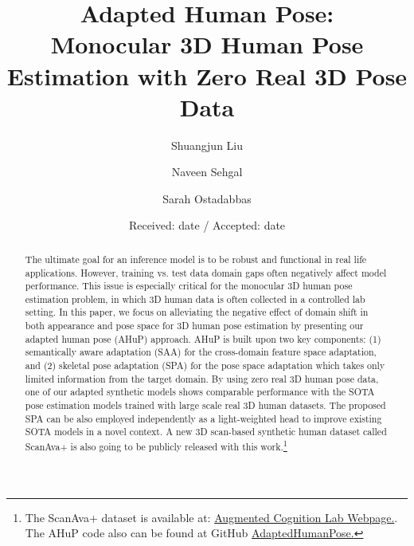 \documentclass[twocolumn]{svjour3}          \smartqed  \usepackage{graphicx}
\begin{document}
\title{Adapted Human Pose: \\Monocular 3D Human Pose Estimation with Zero Real 3D Pose Data}




\author{Shuangjun Liu       \and Naveen Sehgal\and
        Sarah Ostadabbas }




\date{Received: date / Accepted: date}



\maketitle

\begin{abstract}
The ultimate goal for an inference model is to be robust and functional in real life applications. However, training vs. test data domain gaps often negatively affect model performance. This issue is  especially critical  for the monocular 3D human pose estimation problem, in which 3D human data is often collected in a controlled lab setting.  
In this paper, we focus on alleviating the negative effect of domain shift in both appearance and pose space for 3D human pose estimation by presenting our adapted human pose (AHuP) approach. AHuP is built upon two key components:  (1) semantically aware   adaptation (SAA) for the cross-domain feature space adaptation, and (2) skeletal pose adaptation  (SPA) for the pose space adaptation which takes only limited information from the target domain. By using zero real 3D human pose data, one of our adapted synthetic models shows comparable performance with the SOTA pose estimation models trained with large scale real 3D human datasets. The proposed SPA can be also employed independently as a light-weighted head to improve existing SOTA models in a novel context. A new 3D scan-based synthetic  human  dataset  called  ScanAva+ is also going to be publicly released with this work.\footnote{The ScanAva+ dataset is available at: \href{https://web.northeastern.edu/ostadabbas/code/}{Augmented Cognition Lab Webpage.}. The AHuP code  also can be found at GitHub \href{https://github.com/ostadabbas/AdaptedHumanPose}{AdaptedHumanPose.}}
\end{abstract}
\end{document}
